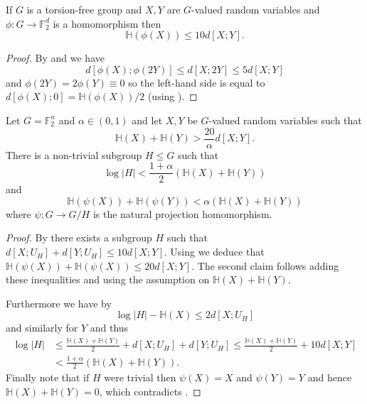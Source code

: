 \begin{lemma}\label{torsion-dist-shrinking}\leanok
If $G$ is a torsion-free group and $X,Y$ are $G$-valued random variables and $\phi:G\to \mathbb{F}_2^d$ is a homomorphism then
\[\mathbb{H}(\phi(X))\leq 10d[X;Y].\]
\end{lemma}
\begin{proof}\leanok
By  and  we have
\[d[\phi(X);\phi(2Y)]\leq d[X;2Y]\leq 5d[X;Y]\]
and $\phi(2Y)=2\phi(Y)\equiv 0$ so the left-hand side is equal to $d[\phi(X);0]=\mathbb{H}(\phi(X))/2$ (using ).
\end{proof}

\begin{lemma}\label{app-ent-pfr}\leanok
Let $G=\mathbb{F}_2^n$ and $\alpha\in (0,1)$ and let $X,Y$ be $G$-valued
random variables such that
\[\mathbb{H}(X)+\mathbb{H}(Y)> \frac{20}{\alpha} d[X;Y].\]
There is a non-trivial subgroup $H\leq G$ such that
\[\log \lvert H\rvert <\frac{1+\alpha}{2}(\mathbb{H}(X)+\mathbb{H}(Y))\] and
\[\mathbb{H}(\psi(X))+\mathbb{H}(\psi(Y))< \alpha (\mathbb{H}(X)+\mathbb{H}(Y))\]
where $\psi:G\to G/H$ is the natural projection homomorphism.
\end{lemma}
\begin{proof}\leanok
By  there exists a subgroup $H$ such that
$d[X;U_H] + d[Y;U_H] \leq 10 d[X;Y]$. Using  we
deduce that $\mathbb{H}(\psi(X)) + \mathbb{H}(\psi(X)) \leq 20 d[X;Y]$. The
second claim follows adding these inequalities and using the assumption on
$\mathbb{H}(X)+\mathbb{H}(Y)$.

Furthermore we have by 
\[\log \lvert H \rvert-\mathbb{H}(X)\leq 2d[X;U_H]\]
and similarly for $Y$ and thus
\begin{align*}
\log \lvert  H\rvert
&\leq
\frac{\mathbb{H}(X)+\mathbb{H}(Y)}{2}+d[X;U_H] + d[Y;U_H] \leq
\frac{\mathbb{H}(X)+\mathbb{H}(Y)}{2}+ 10d[X;Y]
\\& <
\frac{1+\alpha}{2}(\mathbb{H}(X)+\mathbb{H}(Y)).
\end{align*}
Finally note that if $H$
were trivial then $\psi(X)=X$ and $\psi(Y)=Y$ and hence
$\mathbb{H}(X)+\mathbb{H}(Y)=0$, which contradicts .
\end{proof}


